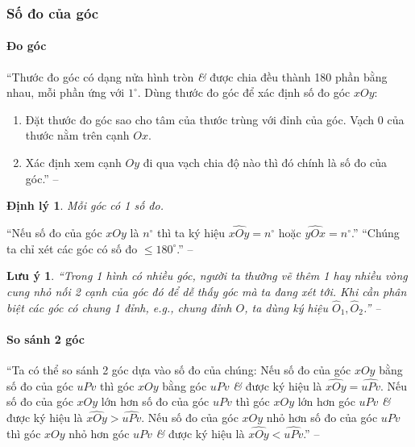 \documentclass{article}
\numberwithin{equation}{section}
\newtheorem{luuy}{Lưu ý}[section]
\newtheorem{dinhly}{Định lý}[section]
\begin{document}
\subsubsection{Số đo của góc}

\paragraph{Đo góc}
``Thước đo góc có dạng nửa hình tròn \textit{\&} được chia đều thành 180 phần bằng nhau, mỗi phần ứng với $1^\circ$. Dùng thước đo góc để xác định số đo góc $xOy$:
\begin{enumerate}
	\item Đặt thước đo góc sao cho tâm của thước trùng với đỉnh của góc. Vạch 0 của thước nằm trên cạnh $Ox$.
	\item Xác định xem cạnh $Oy$ đi qua vạch chia độ nào thì đó chính là số đo của góc.'' -- \cite[p. 96]{SGK_Toan_6_Canh_Dieu_tap_2}
\end{enumerate}

\begin{dinhly}
	Mỗi góc có 1 số đo.
\end{dinhly}
``Nếu số đo của góc $xOy$ là $n^\circ$ thì ta ký hiệu $\widehat{xOy} = n^\circ$ hoặc $\widehat{yOx} = n^\circ$.'' ``Chúng ta chỉ xét các góc có số đo $\le 180^\circ$.'' -- \cite[p. 96]{SGK_Toan_6_Canh_Dieu_tap_2}

\begin{luuy}
	``Trong 1 hình có nhiều góc, người ta thường vẽ thêm 1 hay nhiều vòng cung nhỏ nối 2 cạnh của góc đó để dễ thấy góc mà ta đang xét tới. Khi cần phân biệt các góc có chung 1 đỉnh, e.g., chung đỉnh $O$, ta dùng ký hiệu $\widehat{O}_1,\widehat{O}_2$.'' -- \cite[p. 98]{SGK_Toan_6_Canh_Dieu_tap_2}
\end{luuy}

\paragraph{So sánh 2 góc}
``Ta có thể so sánh 2 góc dựa vào số đo của chúng: Nếu số đo của góc $xOy$ bằng số đo của góc $uPv$ thì góc $xOy$ bằng góc $uPv$ \textit{\&} được ký hiệu là $\widehat{xOy} = \widehat{uPv}$. Nếu số đo của góc $xOy$ lớn hơn số đo của góc $uPv$ thì góc $xOy$ lớn hơn góc $uPv$ \textit{\&} được ký hiệu là $\widehat{xOy} > \widehat{uPv}$. Nếu số đo của góc $xOy$ nhỏ hơn số đo của góc $uPv$ thì góc $xOy$ nhỏ hơn góc $uPv$ \textit{\&} được ký hiệu là $\widehat{xOy} < \widehat{uPv}$.'' -- \cite[p. 98]{SGK_Toan_6_Canh_Dieu_tap_2}
\end{document}
